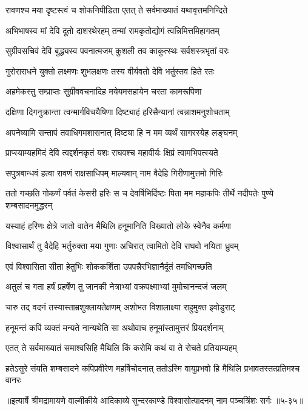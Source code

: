 \twolineshloka
{रावणश्च मया दृष्टस्त्वं च शोकनिपीडिता}
{एतत् ते सर्वमाख्यातं यथावृत्तमनिन्दिते} %

\twolineshloka
{अभिभाषस्व मां देवि दूतो दाशरथेरहम्}
{तन्मां रामकृतोद्योगं त्वन्निमित्तमिहागतम्} %

\twolineshloka
{सुग्रीवसचिवं देवि बुद्ध्यस्व पवनात्मजम्}
{कुशली तव काकुत्स्थः सर्वशस्त्रभृतां वरः} %

\twolineshloka
{गुरोराराधने युक्तो लक्ष्मणः शुभलक्षणः}
{तस्य वीर्यवतो देवि भर्तुस्तव हिते रतः} %

\twolineshloka
{अहमेकस्तु सम्प्राप्तः सुग्रीववचनादिह}
{मयेयमसहायेन चरता कामरूपिणा} %

\twolineshloka
{दक्षिणा दिगनुक्रान्ता त्वन्मार्गविचयैषिणा}
{दिष्ट्याहं हरिसैन्यानां त्वन्नाशमनुशोचताम्} %

\twolineshloka
{अपनेष्यामि सन्तापं तवाधिगमशासनात्}
{दिष्ट्या हि न मम व्यर्थं सागरस्येह लङ्घनम्} %

\twolineshloka
{प्राप्स्याम्यहमिदं देवि त्वद्दर्शनकृतं यशः}
{राघवश्च महावीर्यः क्षिप्रं त्वामभिपत्स्यते} %

\twolineshloka
{सपुत्रबान्धवं हत्वा रावणं राक्षसाधिपम्}
{माल्यवान् नाम वैदेहि गिरीणामुत्तमो गिरिः} %

\threelineshloka
{ततो गच्छति गोकर्णं पर्वतं केसरी हरिः}
{स च देवर्षिभिर्दिष्टः पिता मम महाकपिः}
{तीर्थे नदीपतेः पुण्ये शम्बसादनमुद्धरन्} %

\twolineshloka
{यस्याहं हरिणः क्षेत्रे जातो वातेन मैथिलि}
{हनूमानिति विख्यातो लोके स्वेनैव कर्मणा} %

\twolineshloka
{विश्वासार्थं तु वैदेहि भर्तुरुक्ता मया गुणाः}
{अचिरात् त्वामितो देवि राघवो नयिता ध्रुवम्} %

\twolineshloka
{एवं विश्वासिता सीता हेतुभिः शोककर्शिता}
{उपपन्नैरभिज्ञानैर्दूतं तमधिगच्छति} %

\twolineshloka
{अतुलं च गता हर्षं प्रहर्षेण तु जानकी}
{नेत्राभ्यां वक्रपक्ष्माभ्यां मुमोचानन्दजं जलम्} %

\twolineshloka
{चारु तद् वदनं तस्यास्ताम्रशुक्लायतेक्षणम्}
{अशोभत विशालाक्ष्या राहुमुक्त इवोडुराट्} %

\twolineshloka
{हनूमन्तं कपिं व्यक्तं मन्यते नान्यथेति सा}
{अथोवाच हनूमांस्तामुत्तरं प्रियदर्शनाम्} %

\twolineshloka
{एतत् ते सर्वमाख्यातं समाश्वसिहि मैथिलि}
{किं करोमि कथं वा ते रोचते प्रतियाम्यहम्} %

\twolineshloka
{हतेऽसुरे संयति शम्बसादने कपिप्रवीरेण महर्षिचोदनात्}
{ततोऽस्मि वायुप्रभवो हि मैथिलि प्रभावतस्तत्प्रतिमश्च वानरः} %


॥इत्यार्षे श्रीमद्रामायणे वाल्मीकीये आदिकाव्ये सुन्दरकाण्डे विश्वासोत्पादनम् नाम पञ्चत्रिंशः सर्गः ॥५-३५॥

